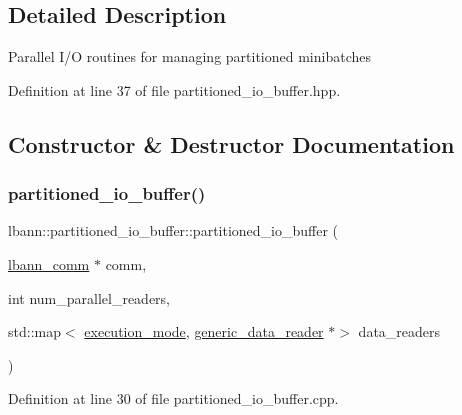 \subsection{Detailed Description}
Parallel I/O routines for managing partitioned minibatches 

Definition at line 37 of file partitioned\+\_\+io\+\_\+buffer.\+hpp.



\subsection{Constructor \& Destructor Documentation}
\mbox{\label{classlbann_1_1partitioned__io__buffer_a2dd39b740a3c0ea613cef9540d3c3e5d}} 
\subsubsection{\texorpdfstring{partitioned\+\_\+io\+\_\+buffer()}{partitioned\_io\_buffer()}\hspace{0.1cm}{\footnotesize\ttfamily [1/2]}}
{\footnotesize\ttfamily lbann\+::partitioned\+\_\+io\+\_\+buffer\+::partitioned\+\_\+io\+\_\+buffer (\begin{DoxyParamCaption}\item[{\hyperlink{classlbann_1_1lbann__comm}{lbann\+\_\+comm} $\ast$}]{comm,  }\item[{int}]{num\+\_\+parallel\+\_\+readers,  }\item[{std\+::map$<$ \hyperlink{base_8hpp_a2781a159088df64ed7d47cc91c4dc0a8}{execution\+\_\+mode}, \hyperlink{classlbann_1_1generic__data__reader}{generic\+\_\+data\+\_\+reader} $\ast$$>$}]{data\+\_\+readers }\end{DoxyParamCaption})}



Definition at line 30 of file partitioned\+\_\+io\+\_\+buffer.\+cpp.



